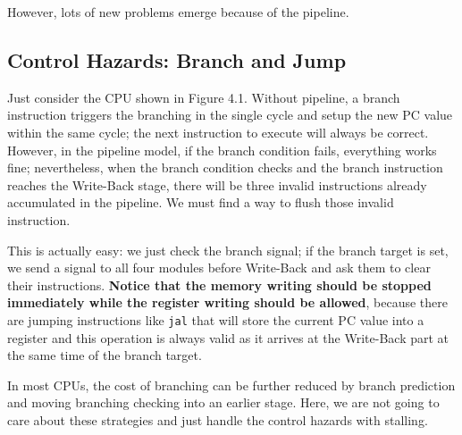 However, lots of new problems emerge because of the pipeline.
\subsection{Control Hazards: Branch and Jump}
Just consider the CPU shown in Figure 4.1. Without pipeline, a branch instruction triggers the branching in the single cycle and setup the new PC value within the same cycle; the next instruction to execute will always be correct. However, in the pipeline model, if the branch condition fails, everything works fine; nevertheless, when the branch condition checks and the branch instruction reaches the Write-Back stage, there will be three invalid instructions already accumulated in the pipeline. We must find a way to flush those invalid instruction.

This is actually easy: we just check the branch signal; if the branch target is set, we send a signal to all four modules before Write-Back and ask them to clear their instructions. \textbf{Notice that the memory writing should be stopped immediately while the register writing should be allowed}, because there are jumping instructions like \texttt{jal} that will store the current PC value into a register and this operation is always valid as it arrives at the Write-Back part at the same time of the branch target.

In most CPUs, the cost of branching can be further reduced by branch prediction and moving branching checking into an earlier stage. Here, we are not going to care about these strategies and just handle the control hazards with stalling.

